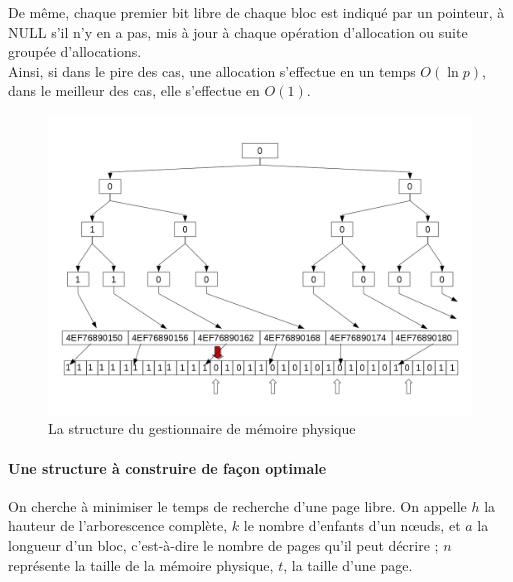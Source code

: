 \documentclass{article}
\begin{document}
  De même, chaque premier bit libre de chaque bloc est indiqué par un pointeur, à NULL s'il  n'y en a pas, mis à jour à chaque opération d'allocation ou suite groupée d'allocations.\\

  Ainsi, si dans le pire des cas, une allocation s'effectue en un temps $O(\ln p)$, dans le meilleur des cas, elle s'effectue en $O(1)$.
\begin{figure}[h]
\begin{center}
\includegraphics[scale=0.45]{AllocationPhysique-structure.png}
\end{center}
\caption{La structure du gestionnaire de mémoire physique}
\label{La structure du gestionnaire de mémoire physique}
\end{figure}

\paragraph*{Une structure à construire de façon optimale}
  On cherche à minimiser le temps de recherche d'une page libre. On appelle $h$ la hauteur de l'arborescence complète, $k$ le nombre d'enfants d'un nœuds, et $a$ la longueur d'un bloc, c'est-à-dire le nombre de pages qu'il peut décrire ; $n$ représente la taille de la mémoire physique, $t$, la taille d'une page.
  
\end{document}
